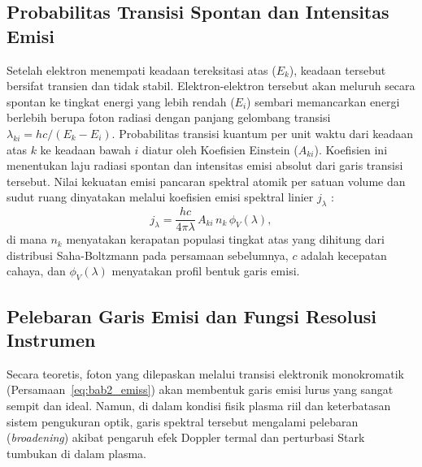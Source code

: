 \subsection{Probabilitas Transisi Spontan dan Intensitas Emisi} \label{subsec:bab2_einstein}

Setelah elektron menempati keadaan tereksitasi atas ($E_k$), keadaan tersebut bersifat transien dan tidak stabil. Elektron-elektron tersebut akan meluruh secara spontan ke tingkat energi yang lebih rendah ($E_i$) sembari memancarkan energi berlebih berupa foton radiasi dengan panjang gelombang transisi $\lambda_{ki} = hc / (E_k - E_i)$. Probabilitas transisi kuantum per unit waktu dari keadaan atas $k$ ke keadaan bawah $i$ diatur oleh Koefisien Einstein ($A_{ki}$). Koefisien ini menentukan laju radiasi spontan dan intensitas emisi absolut dari garis transisi tersebut. Nilai kekuatan emisi pancaran spektral atomik per satuan volume dan sudut ruang dinyatakan melalui koefisien emisi spektral linier $j_\lambda$ \citep{fujimoto_plasma_2004}:
\begin{equation} \label{eq:bab2_emiss}
j_\lambda = \frac{hc}{4\pi\lambda}\,A_{ki}\,n_k\,\phi_V(\lambda),
\end{equation}
di mana $n_k$ menyatakan kerapatan populasi tingkat atas yang dihitung dari distribusi Saha-Boltzmann pada persamaan sebelumnya, $c$ adalah kecepatan cahaya, dan $\phi_V(\lambda)$ menyatakan profil bentuk garis emisi.

\subsection{Pelebaran Garis Emisi dan Fungsi Resolusi Instrumen} \label{subsec:bab2_pelebaran}

Secara teoretis, foton yang dilepaskan melalui transisi elektronik monokromatik (Persamaan~\ref{eq:bab2_emiss}) akan membentuk garis emisi lurus yang sangat sempit dan ideal. Namun, di dalam kondisi fisik plasma riil dan keterbatasan sistem pengukuran optik, garis spektral tersebut mengalami pelebaran (\textit{broadening}) akibat pengaruh efek Doppler termal dan perturbasi Stark tumbukan di dalam plasma.

